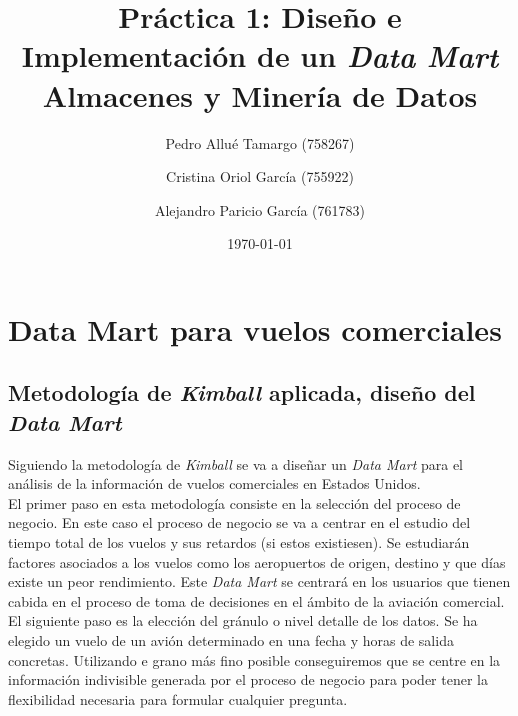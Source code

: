 \documentclass{article}
\begin{document}
\begin{titlepage}
\title{\textbf{\Huge{Práctica 1: Diseño e Implementación de un \textit{Data Mart}}\\
\large{Almacenes y Minería de Datos}}}
\author{
    Pedro Allué Tamargo (758267)
    \and
    Cristina Oriol García (755922)
    \and
    Alejandro Paricio García (761783)
}

\date{\today}
\clearpage\maketitle
\thispagestyle{empty}
\end{titlepage}

\tableofcontents

\newpage
\section{Data Mart para vuelos comerciales}
\subsection{Metodología de \textit{Kimball} aplicada, diseño del \textit{Data Mart}}

Siguiendo la metodología de \textit{Kimball} se va a diseñar un \textit{Data Mart} para el análisis de la información de vuelos comerciales en Estados Unidos.\\
El primer paso en esta metodología consiste en la selección del proceso de negocio. En este caso el proceso de negocio se va a centrar en el estudio del tiempo total de los vuelos y sus retardos (si estos existiesen). Se estudiarán factores asociados a los vuelos como los aeropuertos de origen, destino y que días existe un peor rendimiento. Este \textit{Data Mart} se centrará en los usuarios que tienen cabida en el proceso de toma de decisiones en el ámbito de la aviación comercial.\\

El siguiente paso es la elección del gránulo o nivel detalle de los datos. Se ha elegido un vuelo de un avión determinado en una fecha y horas de salida concretas. Utilizando e grano más fino posible conseguiremos que se centre en la información indivisible generada por el proceso de negocio para poder tener la flexibilidad necesaria para formular cualquier pregunta.\\
\end{document}

